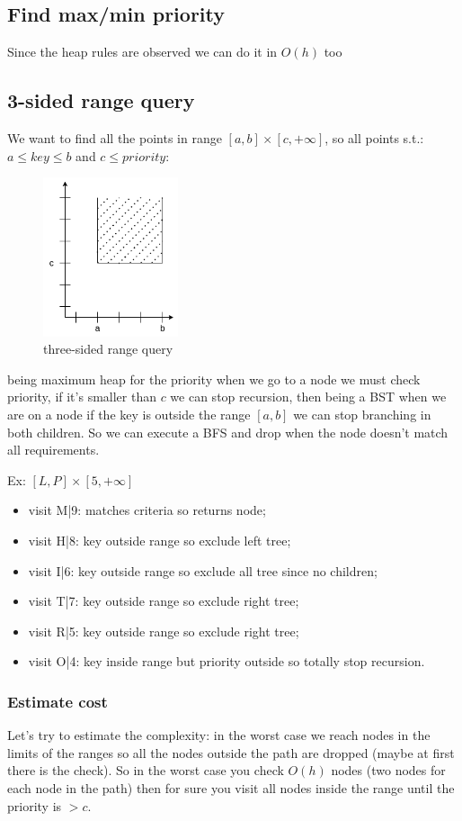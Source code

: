\subsection{Find max/min priority}
Since the heap rules are observed we can do it in $O(h)$ too

\subsection{3-sided range query}
We want to find all the points in range $[a, b] \times [c, +\infty]$, so all points s.t.: $a \leq key \leq b$ and $c \leq priority$:
\begin{figure}[H]
    \centering
    \includegraphics[width=150px]{images/4_Randomized_data_structures/three-sided-query.png}
    \caption{three-sided range query}
\end{figure}
being maximum heap for the priority when we go to a node we must check priority, if it's smaller than $c$ we can stop recursion, then being a BST when we are on a node if the key is outside the range $[a,b]$ we can stop branching in both children.
So we can execute a BFS and drop when the node doesn't match all requirements.

Ex: $[L, P] \times [5, +\infty]$
\begin{itemize}
    \item visit M|9: matches criteria so returns node;
    \item visit H|8: key outside range so exclude left tree;
    \item visit I|6: key outside range so exclude all tree since no children;
    \item visit T|7: key outside range so exclude right tree;
    \item visit R|5: key outside range so exclude right tree;
    \item visit O|4: key inside range but priority outside so totally stop recursion.
\end{itemize}

\subsubsection{Estimate cost}
Let's try to estimate the complexity: in the worst case we reach nodes in the limits of the ranges so all the nodes outside the path are dropped (maybe at first there is the check).
So in the worst case you check $O(h)$ nodes (two nodes for each node in the path) then for sure you visit all nodes inside the range until the priority is $ > c$.

